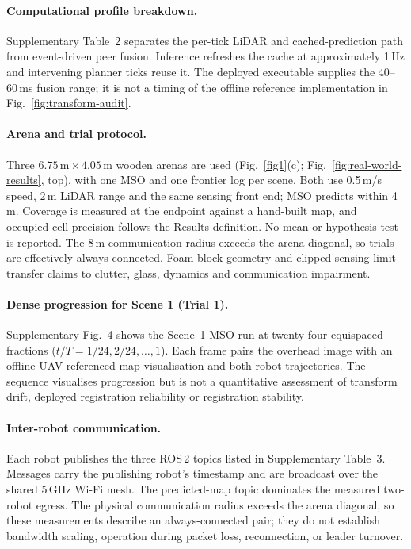 \documentclass[11pt]{article}
\begin{document}
\paragraph{Computational profile breakdown.}
Supplementary Table~2 separates the per-tick LiDAR and cached-prediction path from event-driven peer fusion. Inference refreshes the cache at approximately 1\,Hz and intervening planner ticks reuse it. The deployed executable supplies the 40--60\,ms fusion range; it is not a timing of the offline reference implementation in Fig.~\ref{fig:transform-audit}.

\paragraph{Arena and trial protocol.}
Three $6.75\,\text{m}\times4.05\,\text{m}$ wooden arenas are used (Fig.~\ref{fig1}(c); Fig.~\ref{fig:real-world-results}, top), with one MSO and one frontier log per scene. Both use 0.5\,m/s speed, 2\,m LiDAR range and the same sensing front end; MSO predicts within 4\,m. Coverage is measured at the endpoint against a hand-built map, and occupied-cell precision follows the Results definition. No mean or hypothesis test is reported. The 8\,m communication radius exceeds the arena diagonal, so trials are effectively always connected. Foam-block geometry and clipped sensing limit transfer claims to clutter, glass, dynamics and communication impairment.

\paragraph{Dense progression for Scene 1 (Trial 1).}
Supplementary Fig.~4 shows the Scene~1 MSO run at twenty-four equispaced fractions ($t/T = 1/24,2/24,\ldots,1$). Each frame pairs the overhead image with an offline UAV-referenced map visualisation and both robot trajectories. The sequence visualises progression but is not a quantitative assessment of transform drift, deployed registration reliability or registration stability.

\paragraph{Inter-robot communication.}
Each robot publishes the three ROS\,2 topics listed in Supplementary Table~3. Messages carry the publishing robot's timestamp and are broadcast over the shared 5\,GHz Wi-Fi mesh. The predicted-map topic dominates the measured two-robot egress. The physical communication radius exceeds the arena diagonal, so these measurements describe an always-connected pair; they do not establish bandwidth scaling, operation during packet loss, reconnection, or leader turnover.
\end{document}
